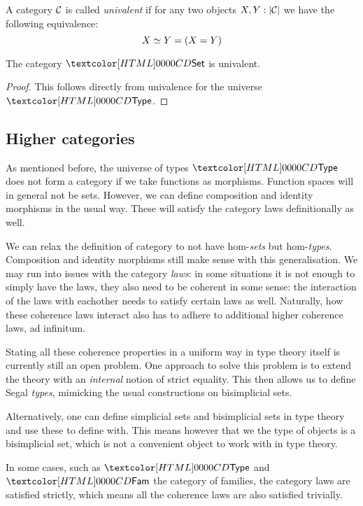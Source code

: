 \begin{definition}
  A category $\mathcal{C}$ is called \emph{univalent} if for any two objects
  $X, Y : | \mathcal{C} |$ we have the following equivalence:
  $$
  X \simeq Y = (X = Y)
  $$  
\end{definition}

\begin{proposition}
  The category $\Set$ is univalent.
\end{proposition}

\begin{proof}
  This follows directly from univalence for the universe $\Type$.
\end{proof}

\subsection{Higher categories}

As mentioned before, the universe of types $\Type$ does not form a
category if we take functions as morphisms. Function spaces will in
general not be sets. However, we can define composition and identity
morphisms in the usual way. These will satisfy the category laws
definitionally as well.

We can relax the definition of category to not have hom-\emph{sets}
but hom-\emph{types}. Composition and identity morphisms still make
sense with this generalisation. We may run into issues with the
category \emph{laws}: in some situations it is not enough to simply
have the laws, they also need to be coherent in some sense: the
interaction of the laws with eachother needs to satisfy certain laws
as well. Naturally, how these coherence laws interact also has to
adhere to additional higher coherence laws, ad infinitum.

Stating all these coherence properties in a uniform way in type theory
itself is currently still an open problem. One approach to solve this
problem is to extend the theory with an \emph{internal} notion of
strict equality. This then allows us to define Segal \emph{types},
mimicking the usual constructions on bisimplicial sets.

Alternatively, one can define simplicial sets and bisimplicial sets in
type theory and use these to define \inftycats with. This means
however that we the type of objects is a bisimplicial set, which is
not a convenient object to work with in type theory.

In some cases, such as $\Type$ and $\Fam$ the category of families,
the category laws are satisfied strictly, which means all the
coherence laws are also satisfied trivially.
